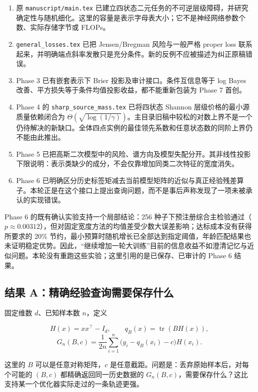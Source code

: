 \documentclass[11pt]{article}
\providecommand{\tightlist}{\setlength{\itemsep}{3pt}\setlength{\parskip}{0pt}}
\begin{document}
\begin{enumerate}
\def\labelenumi{\arabic{enumi}.}
\tightlist
\item
  原 \nolinkurl{manuscript/main.tex} 已建立四状态二元任务的不可逆层级障碍，并研究确定性与随机细化。这里的容量是表示字母表大小；它不是神经网络参数个数、实际存储字节或 FLOPs。
\item
  \nolinkurl{general_losses.tex} 已把 Jensen/Bregman 风险与一般严格 proper loss 联系起来，并明确端点斜率发散只是充分条件。新的反例不应被描述为纠正原稿错误。
\item
  Phase 3 已有嵌套表示下 Brier 投影及审计接口。条件互信息等于 log Bayes 改善、平方损失等于条件均值投影收益，都不能重新包装为 Phase 7 首创。
\item
  Phase 4 的 \nolinkurl{sharp_source_mass.tex} 已将四状态 Shannon 层级价格的最小源质量依赖闭合为 \(\Theta(\sqrt{\log(1/\gamma)})\)。主目录旧稿中较松的对数上界不是一个仍待解决的新缺口。全体四点实例的最佳领先系数和任意状态数的同阶上界仍不能由此推出。
\item
  Phase 5 已把高斯二次模型中的风险、谱方向及模型失配分开。其非线性投影下限说明：表示类缺少的成分，不会仅靠增加同类二次特征的宽度消失。
\item
  Phase 6 已明确区分历史标签矩减去当前模型矩阵的近似与真正经验残差算子。本轮正是在这个接口上提出查询问题，而不是事后声称发现了一项未被承认的实现错误。
\end{enumerate}

Phase 6 的既有确认实验支持一个局部结论：256 种子下预注册综合主检验通过（\(p\approx0.00312\)），但对固定宽度方法的均值差受少数大误差影响；达标成本没有获得所要求的 20\% 节约，最小预算时随机增长已全部达到指定阈值，年龄匹配结果也未证明稳定优势。因此，``继续增加一轮大训练''目前的信息收益不如澄清记忆与近似问题。本轮没有重跑这些实验；这里引用的是已保存、已审计的 Phase 6 结果。

\subsection{结果 A：精确经验查询需要保存什么}\label{ux7ed3ux679c-aux7cbeux786eux7ecfux9a8cux67e5ux8be2ux9700ux8981ux4fddux5b58ux4ec0ux4e48}

固定维数 \(d\)、已知样本数 \(n\)，定义

\[H(x)=xx^\top-I_d,\qquad q_B(x)=\operatorname{tr}(BH(x)),\] \[G_n(B,c)=\frac1{2n}\sum_{i=1}^n\bigl(y_i-q_B(x_i)-c\bigr)H(x_i).\]

这里的 \(B\) 可以是任意对称矩阵，\(c\) 是任意截距。问题是：丢弃原始样本后，对每个可能的 \((B,c)\) 都精确返回同一历史数据的 \(G_n(B,c)\)，需要保存什么？这比支持某一个优化器实际走过的一条轨迹更强。
\end{document}
